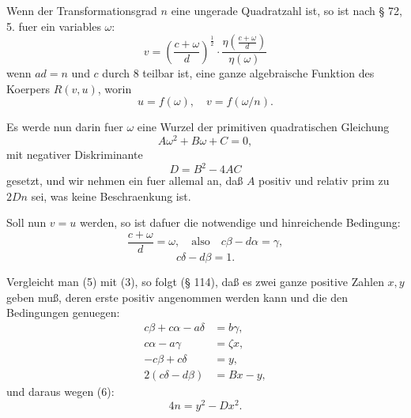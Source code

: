 \documentclass[12pt,a4paper]{article}
\theoremstyle{plain}
\theoremstyle{definition}
\theoremstyle{remark}
\begin{document}
Wenn der Transformationsgrad $n$ eine ungerade Quadratzahl ist, so ist nach \S{} 72, 5. fuer ein variables $\omega$:
\begin{equation}\label{eq:136_1}
v = \left(\frac{c + \omega}{d}\right)^{\frac{1}{2}} \cdot \frac{\eta\left(\frac{c + \omega}{d}\right)}{\eta(\omega)}
\end{equation}
wenn $ad = n$ und $c$ durch 8 teilbar ist, eine ganze algebraische Funktion des Koerpers $R(v, u)$, worin
\begin{equation}\label{eq:136_2}
u = f(\omega), \quad v = f(\omega/n).
\end{equation}

Es werde nun darin fuer $\omega$ eine Wurzel der primitiven quadratischen Gleichung
\begin{equation}\label{eq:136_3}
A\omega^2 + B\omega + C = 0,
\end{equation}
mit negativer Diskriminante
\begin{equation}\label{eq:136_4}
D = B^2 - 4AC
\end{equation}
gesetzt, und wir nehmen ein fuer allemal an, da\ss{} $A$ positiv und relativ prim zu $2Dn$ sei, was keine Beschraenkung ist.

Soll nun $v = u$ werden, so ist dafuer die notwendige und hinreichende Bedingung:
\begin{equation}\label{eq:136_5}
\frac{c + \omega}{d} = \omega, \quad \text{also} \quad c\beta - d\alpha = \gamma,
\end{equation}
\begin{equation}\label{eq:136_6}
c\delta - d\beta = 1.
\end{equation}

Vergleicht man (5) mit (3), so folgt (\S{} 114), da\ss{} es zwei ganze positive Zahlen $x, y$ geben mu\ss{}, deren erste positiv angenommen werden kann und die den Bedingungen genuegen:
\begin{equation}\label{eq:136_7}
\begin{aligned}
c\beta + c\alpha - a\delta &= b\gamma, \\
c\alpha - a\gamma &= \zeta x, \\
-c\beta + c\delta &= y, \\
2(c\delta - d\beta) &= Bx - y,
\end{aligned}
\end{equation}
und daraus wegen (6):
\begin{equation}\label{eq:136_8}
4n = y^2 - Dx^2.
\end{equation}
\end{document}
